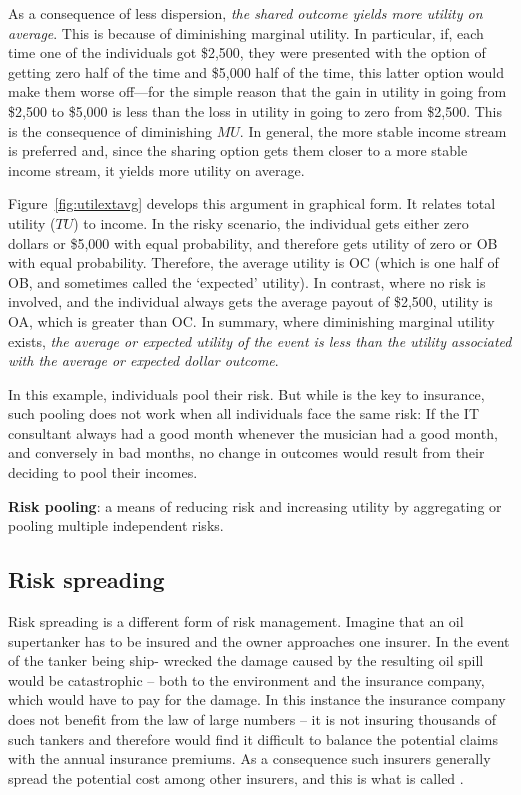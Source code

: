 As a consequence of less dispersion, \textit{the shared outcome yields more utility on average}. This is because of diminishing marginal utility. In particular, if, each time one of the individuals got \$2,500, they were presented with the option of getting zero half of the time and \$5,000 half of the time, this latter option would make them worse off---for the simple reason that the gain in utility in going from \$2,500 to \$5,000 is less than the loss in utility in going to zero from \$2,500. This is the consequence of diminishing $MU$. In general, the more stable income stream is preferred and, since the sharing option gets them closer to a more stable income stream, it yields more utility on average. 

Figure~\ref{fig:utilextavg} develops this argument in graphical form. It relates total utility ($TU$) to income. In the risky scenario, the individual gets either zero dollars or \$5,000 with equal probability, and therefore gets utility of zero or OB with equal probability. Therefore, the average utility is OC (which is one half of OB, and sometimes called the `expected' utility). In contrast, where no risk is involved, and the individual always gets the average payout of \$2,500, utility is OA, which is greater than OC. In summary, where diminishing marginal utility exists, \textit{the average or expected utility of the event is less than the utility associated with the average or expected dollar outcome}.



In this example, individuals pool their risk. But while is the key to insurance, such pooling does not work when all individuals face the same risk: If the IT consultant always had a good month whenever the musician had a good month, and conversely in bad months, no change in outcomes would result from their deciding to pool their incomes.

\begin{DefBox}
\textbf{Risk pooling}: a means of reducing risk and increasing utility by aggregating or pooling multiple independent risks.
\end{DefBox}

\subsection*{Risk spreading}

Risk spreading is a different form of risk management. Imagine that an oil supertanker has to be insured and the owner approaches one insurer. In the event of the tanker being ship- wrecked the damage caused by the resulting oil spill would be catastrophic -- both to the environment and the insurance company, which would have to pay for the damage. In this instance the insurance company does not benefit from the law of large numbers -- it is not insuring thousands of such tankers and therefore would find it difficult to balance the potential claims with the annual insurance premiums. As a consequence such insurers generally spread the potential cost among other insurers, and this is what is called . 

